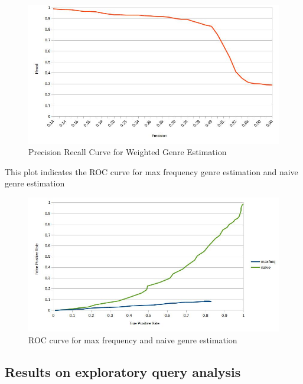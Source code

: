 \begin{figure}
\centering
\includegraphics[width=\textwidth]{precRec.jpg}
\makeatletter
\let\@currsize\normalsize
\caption{Precision Recall Curve for Weighted Genre Estimation}
\label{fig:precRec}
\end{figure}

\noindent This plot indicates the ROC curve for max frequency genre estimation and naive genre estimation
\begin{figure}
\centering
\includegraphics[width=\textwidth]{roc.jpg}
\makeatletter
\let\@currsize\normalsize
\caption{ROC curve for max frequency and naive genre estimation}
\label{fig:roccurve}
\end{figure}


\subsection{Results on exploratory query analysis}

